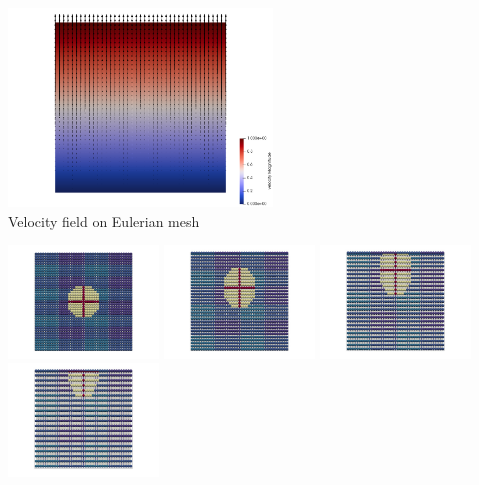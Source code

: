 \begin{center}
\includegraphics[width=7cm]{python_codes/fieldstone_89/results/vertical/vel}\\
{\captionfont Velocity field on Eulerian mesh}
\end{center}


\begin{center}
\includegraphics[width=4cm]{python_codes/fieldstone_89/results/vertical/paint0000}
\includegraphics[width=4cm]{python_codes/fieldstone_89/results/vertical/paint0005}
\includegraphics[width=4cm]{python_codes/fieldstone_89/results/vertical/paint0010}
\includegraphics[width=4cm]{python_codes/fieldstone_89/results/vertical/paint0015}
\end{center}


